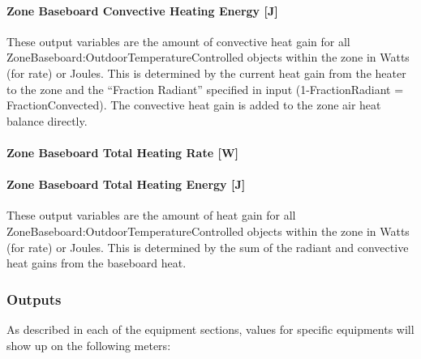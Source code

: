 \paragraph{Zone Baseboard Convective Heating Energy {[}J{]}}\label{zone-baseboard-convective-heating-energy-j}

These output variables are the amount of convective heat gain for all Zone\-Baseboard:\-Outdoor\-Temperature\-Controlled objects within the zone in Watts (for rate) or Joules. This is determined by the current heat gain from the heater to the zone and the ``Fraction Radiant'' specified in input (1-FractionRadiant = FractionConvected). The convective heat gain is added to the zone air heat balance directly.

\paragraph{Zone Baseboard Total Heating Rate {[}W{]}}\label{zone-baseboard-total-heating-rate-w}

\paragraph{Zone Baseboard Total Heating Energy {[}J{]}}\label{zone-baseboard-total-heating-energy-j}

These output variables are the amount of heat gain for all Zone\-Baseboard:\-Outdoor\-Temperature\-Controlled objects within the zone in Watts (for rate) or Joules. This is determined by the sum of the radiant and convective heat gains from the baseboard heat.

\subsubsection{Outputs}\label{outputs-15-001}

As described in each of the equipment sections, values for specific equipments will show up on the following meters:

